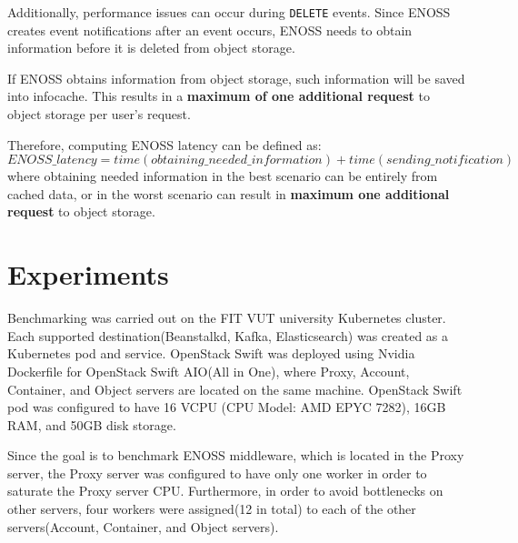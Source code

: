     Additionally, performance issues can occur during \texttt{DELETE} events. Since ENOSS creates event notifications after an event occurs, ENOSS needs to obtain information before it is deleted from object storage.

    If ENOSS obtains information from object storage, such information will be saved into infocache. This results in a \textbf{maximum of one additional request} to object storage per user's request.

    Therefore, computing ENOSS latency can be defined as:
    \texttt{\[ENOSS\_latency = time(obtaining\_needed\_information) + time(sending\_notification)\]}
    where obtaining needed information in the best scenario can be entirely from cached data, or in the worst scenario can result in \textbf{maximum one additional request} to object storage.

    \section{Experiments}
    Benchmarking was carried out on the FIT VUT university Kubernetes cluster. Each supported destination(Beanstalkd, Kafka, Elasticsearch) was created as a Kubernetes pod and service. OpenStack Swift was deployed using Nvidia Dockerfile for OpenStack Swift AIO(All in One), where Proxy, Account, Container, and Object servers are located on the same machine. OpenStack Swift pod was configured to have 16 VCPU (CPU Model: AMD EPYC 7282), 16GB RAM, and 50GB disk storage.

    Since the goal is to benchmark ENOSS middleware, which is located in the Proxy server, the Proxy server was configured to have only one worker in order to saturate the Proxy server CPU. Furthermore, in order to avoid bottlenecks on other servers, four workers were assigned(12 in total) to each of the other servers(Account, Container, and Object servers).

